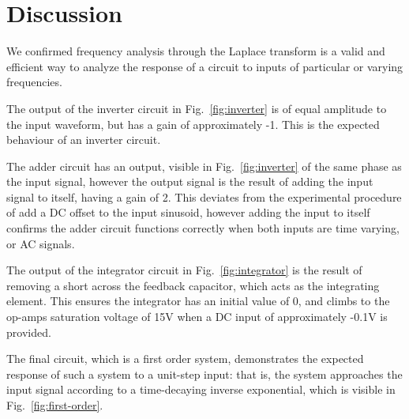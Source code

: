 \section{Discussion}\label{sec:discussion}
We confirmed frequency analysis through the Laplace transform is a valid and efficient way to analyze the response of a circuit to inputs of particular or varying frequencies. 

The output of the inverter circuit in Fig.~\ref{fig:inverter} is of equal amplitude to the input waveform, but has a gain of approximately -1. This is the expected behaviour of an inverter circuit.

The adder circuit has an output, visible in Fig.~\ref{fig:inverter} of the same phase as the input signal, however the output signal is the result of adding the input signal to itself, having a gain of 2. This deviates from the experimental procedure of add a DC offset to the input sinusoid, however adding the input to itself confirms the adder circuit functions correctly when both inputs are time varying, or AC signals.

The output of the integrator circuit in Fig.~\ref{fig:integrator} is the result of removing a short across the feedback capacitor, which acts as the integrating element. This ensures the integrator has an initial value of 0, and climbs to the op-amps saturation voltage of 15\si{\volt} when a DC input of approximately -0.1\si{\volt} is provided.

The final circuit, which is a first order system, demonstrates the expected response of such a system to a unit-step input: that is, the system approaches the input signal according to a time-decaying inverse exponential, which is visible in Fig.~\ref{fig:first-order}.
